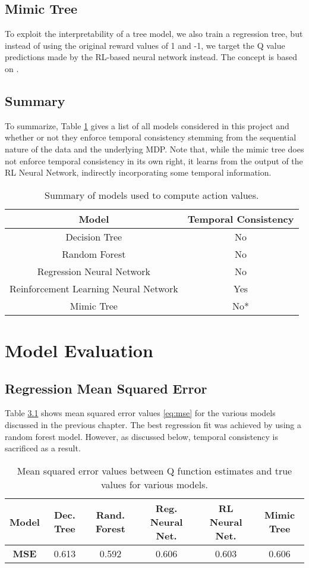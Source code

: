 \documentclass{sfuthesis}
\begin{document}
	\section{Mimic Tree}
	
	To exploit the interpretability of a tree model, we also train a regression tree, but instead of using the original reward values of 1 and -1, we target the Q value predictions made by the RL-based neural network instead. The concept is based on \cite{sun2020cracking}.
	
	\section{Summary}
	To summarize, Table \ref{tab:model_summary} gives a list of all models considered in this project and whether or not they enforce temporal consistency stemming from the sequential nature of the data and the underlying MDP. Note that, while the mimic tree does not enforce temporal consistency in its own right, it learns from the output of the RL Neural Network, indirectly incorporating some temporal information.
	\begin{table}[ht]
		\centering
		\begin{tabular}{c|c}
			\textbf{Model} & \textbf{Temporal Consistency} \\ \hline
			Decision Tree & No \\
			Random Forest & No \\
			Regression Neural Network & No \\
			Reinforcement Learning Neural Network & Yes \\
			Mimic Tree & No* \\
		\end{tabular}
		\caption{Summary of models used to compute action values.}
		\label{tab:model_summary}
	\end{table}
	
	\chapter{Model Evaluation}
	
	\section{Regression Mean Squared Error}
	Table \ref{tab:mse-models} shows mean squared error values \eqref{eq:mse} for the various models discussed in the previous chapter. The best regression fit was achieved by using a random forest model. However, as discussed below, temporal consistency is sacrificed as a result.
	\begin{table}[ht]
		\centering
		\begin{tabular}{c|ccccc}
			\textbf{Model} & Dec. Tree & Rand. Forest & Reg. Neural Net. & RL Neural Net. & Mimic Tree \\ \hline
			\textbf{MSE}   & 0.613     & 0.592        & 0.606           & 0.603          & 0.606     
		\end{tabular}
		\caption{Mean squared error values between Q function estimates and true values for various models.}
		\label{tab:mse-models}
	\end{table}
	
\end{document}
